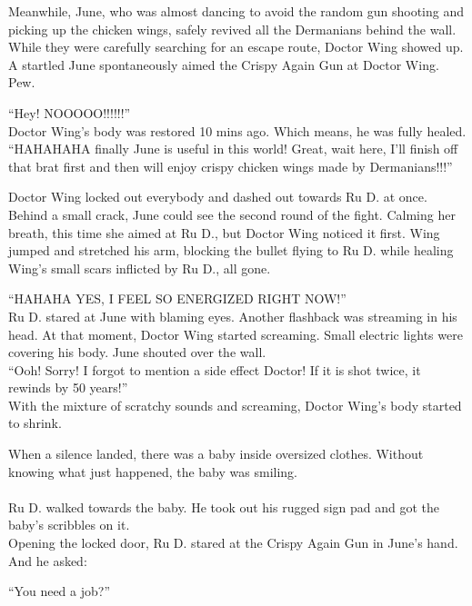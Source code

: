 Meanwhile, June, who was almost dancing to avoid the random gun shooting and picking up the chicken wings, safely revived all the Dermanians behind the wall. While they were carefully searching for an escape route, Doctor Wing showed up. A startled June spontaneously aimed the Crispy Again Gun at Doctor Wing. Pew.

``Hey! NOOOOO!!!!!!'' \\
Doctor Wing's body was restored 10 mins ago. Which means, he was fully healed. \\
``HAHAHAHA finally June is useful in this world! Great, wait here, I'll finish off that brat first and then will enjoy crispy chicken wings made by Dermanians!!!''

Doctor Wing locked out everybody and dashed out towards Ru D. at once. Behind a small crack, June could see the second round of the fight. Calming her breath, this time she aimed at Ru D., but Doctor Wing noticed it first. Wing jumped and stretched his arm, blocking the bullet flying to Ru D. while healing Wing's small scars inflicted by Ru D., all gone.

``HAHAHA YES, I FEEL SO ENERGIZED RIGHT NOW!'' \\
Ru D. stared at June with blaming eyes. Another flashback was streaming in his head. At that moment, Doctor Wing started screaming. Small electric lights were covering his body. June shouted over the wall. \\
``Ooh! Sorry! I forgot to mention a side effect Doctor! If it is shot twice, it rewinds by 50 years!'' \\
With the mixture of scratchy sounds and screaming, Doctor Wing's body started to shrink.
 
When a silence landed, there was a baby inside oversized clothes. Without knowing what just happened, the baby was smiling. \\ \\
Ru D. walked towards the baby. He took out his rugged sign pad and got the baby's scribbles on it. \\
Opening the locked door, Ru D. stared at the Crispy Again Gun in June's hand. And he asked:

``You need a job?''